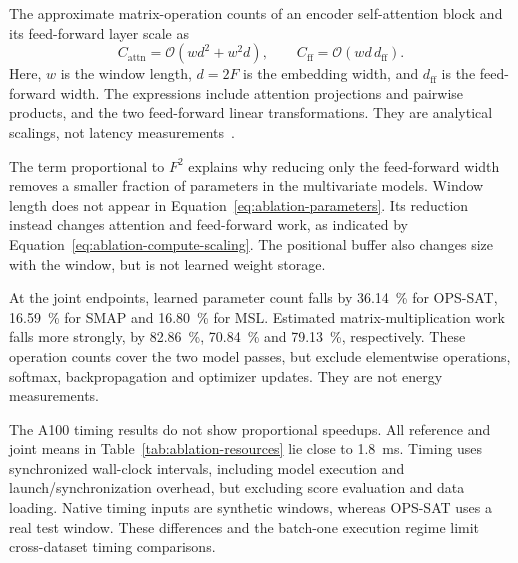 The approximate matrix-operation counts of an encoder self-attention
block and its feed-forward layer scale as
\begin{equation}
  C_{\mathrm{attn}}=\mathcal{O}(w d^2+w^2d),
  \qquad
  C_{\mathrm{ff}}=\mathcal{O}(w d\,d_{\mathrm{ff}}).
  \label{eq:ablation-compute-scaling}
\end{equation}
Here, $w$ is the window length, $d=2F$ is the embedding width,
and $d_{\mathrm{ff}}$ is the feed-forward width. The expressions
include attention projections and pairwise products, and the
two feed-forward linear transformations. They are analytical
scalings, not latency measurements~\cite{Vaswani2017Attention,Sze2017EfficientDNN}.

The term proportional to \(F^2\) explains why reducing only the
feed-forward width removes a smaller fraction of parameters in the
multivariate models. Window length does not appear in
Equation~\eqref{eq:ablation-parameters}. Its reduction instead changes
attention and feed-forward work, as indicated by
Equation~\eqref{eq:ablation-compute-scaling}. The positional buffer
also changes size with the window, but is not learned weight storage.

\begin{table}[htbp]
  \centering
  \small
  \setlength{\tabcolsep}{5pt}
  
  \caption{Reference and joint-endpoint resources. Parameter counts,
  FP32 weight storage and matrix-multiplication MACs are computed quantities.
  Weight storage excludes buffers, optimizer state and file overhead;
  \num{1} KiB is \num{1024} bytes. Forward time is mean \(\pm\) sample
  standard deviation of the three seed-specific median latencies, measured
  at batch size \num{1} on an NVIDIA A100-PCIE-40GB. Each median uses
  \num{50} timed forwards after \num{10} warm-ups.}
  \label{tab:ablation-resources}
\end{table}

At the joint endpoints, learned parameter count falls by
\SI{36.14}{\percent} for \ac{OPS-SAT}, \SI{16.59}{\percent} for
\ac{SMAP} and \SI{16.80}{\percent} for \ac{MSL}.
Estimated matrix-multiplication work falls more strongly, by
\SI{82.86}{\percent}, \SI{70.84}{\percent} and
\SI{79.13}{\percent}, respectively. These operation counts cover the
two model passes, but exclude elementwise operations, softmax,
backpropagation and optimizer updates. They are not energy measurements.

The A100 timing results do not show proportional speedups. All reference
and joint means in Table~\ref{tab:ablation-resources} lie close to
\SI{1.8}{\milli\second}. Timing uses synchronized wall-clock intervals,
including model execution and launch/synchronization overhead, but excluding
score evaluation and data loading. Native timing inputs are synthetic
windows, whereas \ac{OPS-SAT} uses a real test window. These differences
and the batch-one execution regime limit cross-dataset timing comparisons.

